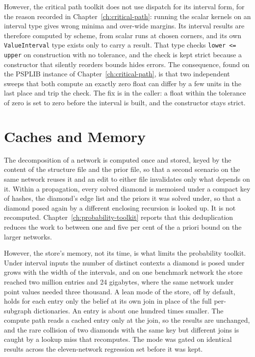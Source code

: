 \documentclass[12pt]{report}
\begin{document}
However, the critical path toolkit does not use dispatch for its interval form, for the reason recorded in Chapter~\ref{ch:critical-path}: running the scalar kernels
on an interval type gives wrong minima and over-wide margins. Its interval results are
therefore computed by scheme, from scalar runs at chosen corners, and its own
\texttt{ValueInterval} type exists only to carry a result. That type checks
\texttt{lower <= upper} on construction with no tolerance, and the check is kept strict
because a constructor that silently reorders bounds hides errors. The consequence,
found on the PSPLIB instance of Chapter~\ref{ch:critical-path}, is that two independent
sweeps that both compute an exactly zero float can differ by a few units in the last place
and trip the check. The fix is in the caller: a float within the tolerance of zero is set
to zero before the interval is built, and the constructor stays strict.

\section{Caches and Memory}
\label{sec:pkg-caches}

The decomposition of a network is computed once and stored, keyed by the content of the
structure file and the prior file, so that a second scenario on the same network reuses it
and an edit to either file invalidates only what depends on it. Within a propagation, every
solved diamond is memoised under a compact key of hashes, the diamond's edge list and the
priors it was solved under, so that a diamond posed again by a different enclosing
recursion is looked up. It is not recomputed. Chapter~\ref{ch:probability-toolkit} reports
that this deduplication reduces the work to between one and five per cent of the a priori
bound on the larger networks.

However, the store's memory, not its time, is what limits the probability toolkit. Under
interval inputs the number of distinct contexts a diamond is posed under grows with the
width of the intervals, and on one benchmark network the store reached two million entries
and 24 gigabytes, where the same network under point values needed three thousand. A lean
mode of the store, off by default, holds for each entry only the belief at its own join
in place of the full per-subgraph dictionaries. An entry is about one hundred times
smaller. The compute path reads a cached entry only at the join, so the results are unchanged,
and the rare collision of two diamonds with the same key but different joins is caught by a
lookup miss that recomputes. The mode was gated on identical results across the
eleven-network regression set before it was kept.
\end{document}
